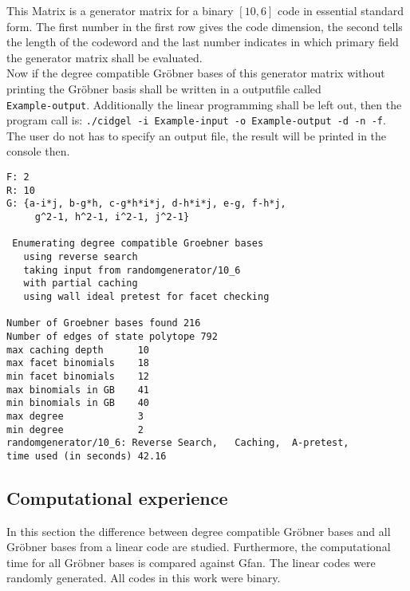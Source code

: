 This Matrix is a generator matrix for a binary $[10,6]$ code in essential standard form. 
The first number in the first row gives the code dimension, the second tells the length of the codeword and the last number indicates in which primary field the generator matrix shall be evaluated.\\

Now if the degree compatible Gröbner bases of this generator  matrix without printing the Gröbner basis shall be written in a outputfile called \\ \texttt{Example-output}. Additionally the linear programming shall be left out, then the program call is: \texttt{./cidgel -i Example-input -o Example-output -d -n -f}.
The user do not has to specify an output file, the result will be printed in the console then.

\newpage

 \begin{lstlisting}[basicstyle=\fontfamily{courier}\selectfont,language={}] %
% starting GB:
F: 2
R: 10
G: {a-i*j, b-g*h, c-g*h*i*j, d-h*i*j, e-g, f-h*j,
	 g^2-1, h^2-1, i^2-1, j^2-1}

 Enumerating degree compatible Groebner bases
   using reverse search
   taking input from randomgenerator/10_6
   with partial caching
   using wall ideal pretest for facet checking

Number of Groebner bases found 216
Number of edges of state polytope 792
max caching depth      10
max facet binomials    18
min facet binomials    12
max binomials in GB    41
min binomials in GB    40
max degree             3
min degree             2
randomgenerator/10_6: Reverse Search,   Caching,  A-pretest,
time used (in seconds) 42.16
\end{lstlisting}
  
\newpage


\subsection{Computational experience}
\label{subsec:compexp} 
In this section the difference between degree compatible Gröbner bases and all Gröbner bases from a linear code are studied. Furthermore, the computational time for all Gröbner bases is compared against Gfan.
The linear codes were randomly generated. All codes in this work were binary.

